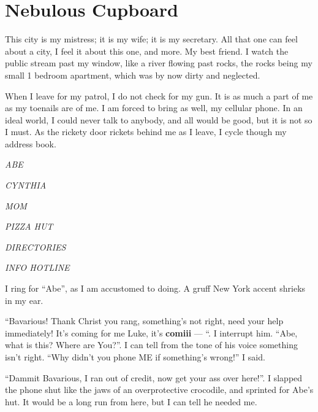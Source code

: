 \chapter{Nebulous Cupboard}





This city is my mistress; it is my wife; it is my secretary. All
that one can feel about a city, I feel it about this one, and more.
My best friend. I watch the public stream past my window, like a
river flowing past rocks, the rocks being my small 1 bedroom
apartment, which was by now dirty and neglected.



When I leave for my patrol, I do not check for my gun. It is as
much a part of me as my toenails are of me. I am forced to bring as
well, my cellular phone. In an ideal world, I could never talk to
anybody, and all would be good, but it is not so I must. As the
rickety door rickets behind me as I leave, I cycle though my
address book.



{\em ABE}



{\em CYNTHIA}



{\em MOM}



{\em PIZZA HUT}



{\em DIRECTORIES}



{\em INFO HOTLINE}



I ring for ``Abe'', as I am accustomed to doing. A gruff
New York accent shrieks in my ear.



``Bavarious! Thank Christ you rang, something's not
right, need your help immediately! It's coming for me Luke,
it's {\bf comiii} --- ``. I interrupt him. ``Abe,
what is this? Where are You?''. I can tell from the tone of
his voice something isn't right. ``Why didn't you
phone ME if something's wrong!'' I said.



``Dammit Bavarious, I ran out of credit, now get your ass over
here!''. I slapped the phone shut like the jaws of an
overprotective crocodile, and sprinted for Abe's hut. It
would be a long run from here, but I can tell he needed me.



